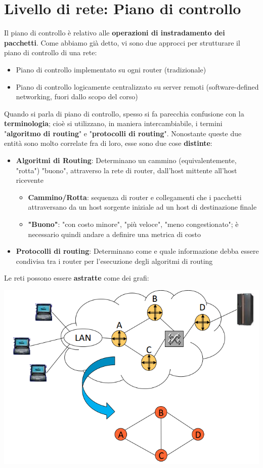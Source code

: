\documentclass[12pt]{article}
\begin{document}
\section{Livello di rete: Piano di controllo}
Il piano di controllo è relativo alle \textbf{operazioni di instradamento dei pacchetti}.
Come abbiamo già detto, vi sono due approcci per strutturare il piano di controllo di una rete:
\begin{itemize}
    \item Piano di controllo implementato su ogni router (tradizionale)
    \item Piano di controllo logicamente centralizzato su server remoti (software-defined networking, fuori dallo scopo del corso)
\end{itemize}
Quando si parla di piano di controllo, spesso si fa parecchia confusione con la \textbf{terminologia}; cioè si utilizzano, in maniera intercambiabile, i termini "\textbf{algoritmo di routing}" e "\textbf{protocolli di routing}".
Nonostante queste due entità sono molto correlate fra di loro, esse sono due cose \textbf{distinte}:
\begin{itemize}
    \item \textbf{Algoritmi di Routing}: Determinano un cammino (equivalentemente, "rotta") "buono", attraverso la rete di router, dall'host mittente all'host ricevente
    \begin{itemize}
        \item \textbf{Cammino/Rotta}: sequenza di router e collegamenti che i pacchetti attraversano da un host sorgente iniziale ad un host di destinazione finale
        \item \textbf{"Buono"}: "con costo minore", "più veloce", "meno congestionato"; è necessario quindi andare a definire una metrica di costo
    \end{itemize}
    \item \textbf{Protocolli di routing}: Determinano come e quale informazione debba essere condivisa tra i router per l'esecuzione degli algoritmi di routing
\end{itemize}
Le reti possono essere \textbf{astratte} come dei grafi:
\begin{center}
    \includegraphics[width =0.60\linewidth]{Images/96.png}
\end{center}
\end{document}
